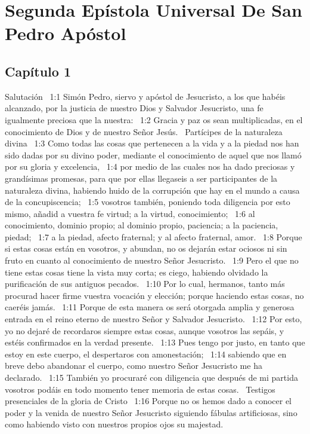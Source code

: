 \chapter{Segunda Epístola Universal De San Pedro Apóstol}

\section*{Capítulo 1}
Salutación  
1:1 Simón Pedro, siervo y apóstol de Jesucristo, a los que habéis alcanzado, por la justicia de nuestro Dios y Salvador Jesucristo, una fe igualmente preciosa que la nuestra:  
1:2 Gracia y paz os sean multiplicadas, en el conocimiento de Dios y de nuestro Señor Jesús.  
Partícipes de la naturaleza divina  
1:3 Como todas las cosas que pertenecen a la vida y a la piedad nos han sido dadas por su divino poder, mediante el conocimiento de aquel que nos llamó por su gloria y excelencia,  
1:4 por medio de las cuales nos ha dado preciosas y grandísimas promesas, para que por ellas llegaseis a ser participantes de la naturaleza divina, habiendo huido de la corrupción que hay en el mundo a causa de la concupiscencia;  
1:5 vosotros también, poniendo toda diligencia por esto mismo, añadid a vuestra fe virtud; a la virtud, conocimiento;  
1:6 al conocimiento, dominio propio; al dominio propio, paciencia; a la paciencia, piedad;  
1:7 a la piedad, afecto fraternal; y al afecto fraternal, amor.  
1:8 Porque si estas cosas están en vosotros, y abundan, no os dejarán estar ociosos ni sin fruto en cuanto al conocimiento de nuestro Señor Jesucristo.  
1:9 Pero el que no tiene estas cosas tiene la vista muy corta; es ciego, habiendo olvidado la purificación de sus antiguos pecados.  
1:10 Por lo cual, hermanos, tanto más procurad hacer firme vuestra vocación y elección; porque haciendo estas cosas, no caeréis jamás.  
1:11 Porque de esta manera os será otorgada amplia y generosa entrada en el reino eterno de nuestro Señor y Salvador Jesucristo.  
1:12 Por esto, yo no dejaré de recordaros siempre estas cosas, aunque vosotros las sepáis, y estéis confirmados en la verdad presente.  
1:13 Pues tengo por justo, en tanto que estoy en este cuerpo, el despertaros con amonestación;  
1:14 sabiendo que en breve debo abandonar el cuerpo, como nuestro Señor Jesucristo me ha declarado.  
1:15 También yo procuraré con diligencia que después de mi partida vosotros podáis en todo momento tener memoria de estas cosas.  
Testigos presenciales de la gloria de Cristo  
1:16 Porque no os hemos dado a conocer el poder y la venida de nuestro Señor Jesucristo siguiendo fábulas artificiosas, sino como habiendo visto con nuestros propios ojos su majestad.  
